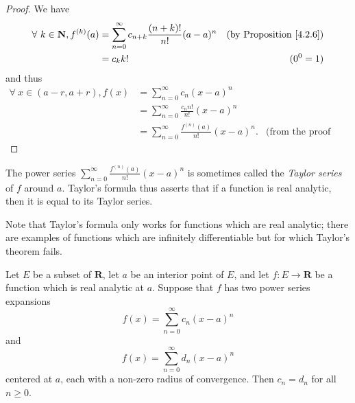\begin{proof}
    We have
    \begin{align*}
        \forall\ k \in \mathbf{N}, f^{(k)}(a) & = \sum_{n = 0}^\infty c_{n + k} \frac{(n + k)!}{n!} (a - a)^n & \text{(by Proposition \ref{4.2.6})} \\
                                              & = c_k k!                                                      & (0^0 = 1)
    \end{align*}
    and thus
    \begin{align*}
        \forall\ x \in (a - r, a + r), f(x) & = \sum_{n = 0}^\infty c_n (x - a)^n                                                    \\
                                            & = \sum_{n = 0}^\infty \frac{c_n n!}{n!} (x - a)^n                                      \\
                                            & = \sum_{n = 0}^\infty \frac{f^{(n)}(a)}{n!} (x - a)^n. & \text{(from the proof above)}
    \end{align*}
\end{proof}

\begin{note}
    The power series \(\sum_{n = 0}^\infty \frac{f^{(n)}(a)}{n!} (x - a)^n\) is sometimes called the \emph{Taylor series} of \(f\) around \(a\).
    Taylor's formula thus asserts that if a function is real analytic, then it is equal to its Taylor series.
\end{note}

\begin{remark}\label{4.2.11}
    Note that Taylor's formula only works for functions which are real analytic;
    there are examples of functions which are infinitely differentiable but for which Taylor's theorem fails.
\end{remark}

\begin{corollary}\label{4.2.12}
    Let \(E\) be a subset of \(\mathbf{R}\), let \(a\) be an interior point of \(E\), and let \(f : E \to \mathbf{R}\) be a function which is real analytic at \(a\).
    Suppose that \(f\) has two power series expansions
    \[
        f(x) = \sum_{n = 0}^\infty c_n (x - a)^n
    \]
    and
    \[
        f(x) = \sum_{n = 0}^\infty d_n (x - a)^n
    \]
    centered at \(a\), each with a non-zero radius of convergence.
    Then \(c_n = d_n\) for all \(n \geq 0\).
\end{corollary}

